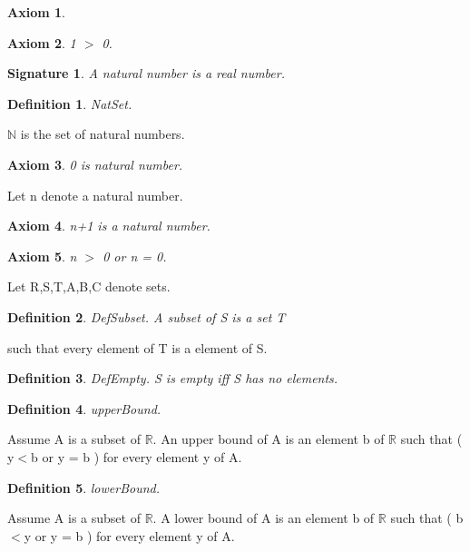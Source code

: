 \documentclass{article}
\newenvironment{forthel}{\begin{leftbar}}{\end{leftbar}}
\newtheorem{axiom}{Axiom}
\newtheorem{definition}{Definition}
\newtheorem{signature}{Signature}
\begin{document}
\begin{forthel}
\begin{axiom}
\end{axiom}

\begin{axiom} 1 $>$ 0.

\end{axiom}


\begin{signature} A natural number is a real number.

\end{signature}

\begin{definition} NatSet.

\end{definition}
$\mathbb{N}$ is the set of natural numbers.

\begin{axiom} 0 is natural number.

\end{axiom}
Let n denote a natural number.
\begin{axiom} n+1 is a natural number.

\end{axiom}
\begin{axiom} n $>$ 0 or n = 0.

\end{axiom}




Let R,S,T,A,B,C denote sets.

\begin{definition} DefSubset.   A subset of S is a set T

\end{definition}
such that every element of T is a element of S.

\begin{definition} DefEmpty.    S is empty iff S has no elements.

\end{definition}


\begin{definition} upperBound.

\end{definition}
Assume A is a subset of $\mathbb{R}$.
An upper bound of A is an element b of $\mathbb{R}$ such that ( y$<$b or y = b ) for every element y of A.

\begin{definition} lowerBound.

\end{definition}
Assume A is a subset of $\mathbb{R}$.
A lower bound of A is an element b of $\mathbb{R}$ such that ( b$<$y or y = b ) for every element y of A.


\end{forthel}
\end{document}
